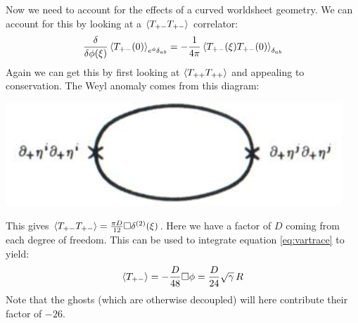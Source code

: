 \documentclass[11pt, class=article, crop=false]{standalone}
\begin{document}
\begin{enumerate}
	Now we need to account for the effects of a curved worldsheet geometry. We can account for this by looking at a $\braket{T_{+ -} T_{+ -}}$ correlator:
	\begin{equation}\label{eq:vartrace}
		\frac{\delta}{\delta \phi(\xi)} \braket{T_{+-} (0)}_{e^\phi \delta_{ab}} = -\frac{1}{4\pi} \braket{T_{+ -}(\xi) T_{+ -}(0)}_{\delta_{ab}}
	\end{equation}
	 Again we can get this by first looking at $\braket{T_{++} T_{++}}$ and appealing to conservation. The Weyl anomaly comes from this diagram:
	\begin{center}
		\includegraphics[scale=0.6]{Figures/Phi0}
	\end{center}
	This gives $\braket{T_{+-} T_{+-}} = \frac{\pi D}{12} \Box \delta^{(2)}(\xi)$. Here we have a factor of $D$ coming from each degree of freedom. This can be used to integrate equation \eqref{eq:vartrace} to yield:
	\[
		\braket{T_{+-}} = -\frac{D}{48} \Box \phi = \frac{D}{24} \sqrt \gamma\, R
	\]
	Note that the ghosts (which are otherwise decoupled) will here contribute their factor of $-26$.
	

\end{enumerate}
\end{document}
